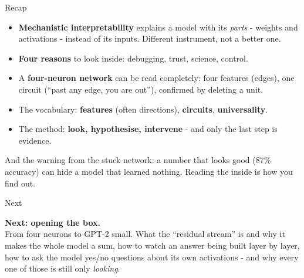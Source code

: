 \documentclass[aspectratio=169]{beamer}
\newcommand{\trapbox}[1]{%
  \begin{tcolorbox}[colback=armred!8, colframe=armred, boxrule=0.6pt, arc=2pt]
  #1
  \end{tcolorbox}}
\newcommand{\takebox}[1]{%
  \begin{tcolorbox}[colback=paramgreen!8, colframe=paramgreen, boxrule=0.6pt, arc=2pt]
  #1
  \end{tcolorbox}}
\begin{document}
\begin{frame}{Recap}
  \vspace{0.4em}
  \begin{itemize}
    \item \textbf{Mechanistic interpretability} explains a model with its \emph{parts} - weights and
      activations - instead of its inputs. Different instrument, not a better one.
    \item \textbf{Four reasons} to look inside: debugging, trust, science, control.
    \item A \textbf{four-neuron network} can be read completely: four features (edges), one circuit
      (``past any edge, you are out''), confirmed by deleting a unit.
    \item The vocabulary: \textbf{features} (often directions), \textbf{circuits},
      \textbf{universality}.
    \item The method: \textbf{look, hypothesise, intervene} - and only the last step is evidence.
  \end{itemize}

  \vspace{0.6em}
  \trapbox{\small And the warning from the stuck network: a number that looks good (87\%
  accuracy) can hide a model that learned nothing. Reading the inside is how you find out.}
\end{frame}

\begin{frame}{Next}
  \vspace{1.2em}
  \takebox{\textbf{Next: opening the box.}\\[0.6em]
  From four neurons to GPT-2 small. What the ``residual stream'' is and why it makes the whole
  model a sum, how to watch an answer being built layer by layer, how to ask the model yes/no
  questions about its own activations - and why every one of those is still only
  \emph{looking}.}
\end{frame}
\end{document}
